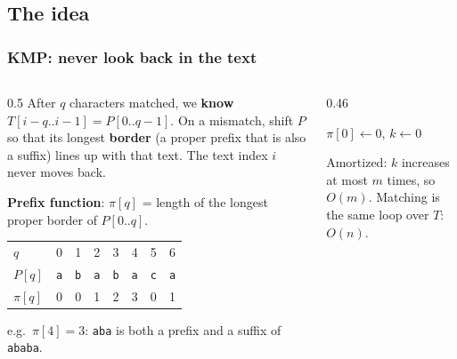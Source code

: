 \documentclass[aspectratio=169,10pt,compress]{beamer}
\begin{document}

\subsection[Idea]{The idea}




\begin{frame}[t,fragile] \frametitle{KMP: never look back in the text}
  \begin{columns}[T]
    \begin{column}{0.5\textwidth}
      \small After $q$ characters matched, we \textbf{know} $T[i-q..i-1] = P[0..q-1]$.
      On a mismatch, shift $P$ so that its longest \textbf{border} (a proper prefix that is also a suffix)
      lines up with that text. The text index $i$ never moves back.

      \vspace{0.4em}
      \textbf{Prefix function}: $\pi[q]$ = length of the longest proper border of $P[0..q]$.
      \vspace{0.4em}

      \begin{tabular}{@{}l*{7}{c}@{}}
        \toprule
        $q$      & 0 & 1 & 2 & 3 & 4 & 5 & 6 \\
        $P[q]$   & \texttt{a} & \texttt{b} & \texttt{a} & \texttt{b} & \texttt{a} & \texttt{c} & \texttt{a} \\
        $\pi[q]$ & 0 & 0 & 1 & 2 & 3 & 0 & 1 \\
        \bottomrule
      \end{tabular}

      \vspace{0.3em}
      \footnotesize e.g.\ $\pi[4] = 3$: \texttt{aba} is both a prefix and a suffix of \texttt{ababa}.
    \end{column}
    \begin{column}{0.46\textwidth}
      \SetAlFnt{\small}


\begin{algorithm}[H]
  \caption{PrefixFunction($P$)}
  $\pi[0] \leftarrow 0$, \quad $k \leftarrow 0$\;
  \Return{$\pi$}\;
\end{algorithm}


      \small Amortized: $k$ increases at most $m$ times, so $O(m)$. Matching is the same loop over $T$: $O(n)$.
    \end{column}
  \end{columns}
\end{frame}
\end{document}
